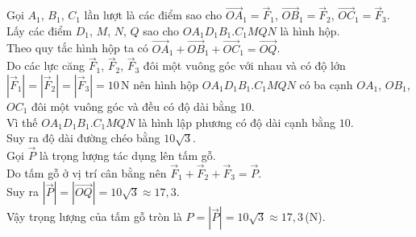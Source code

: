 \begin{ex}
{\begin{center}
\end{center}
Gọi $A_1$, $B_1$, $C_1$ lần lượt là các điểm sao cho $\overrightarrow{OA}_1=\overrightarrow{F}_1$, $\overrightarrow{OB}_1=\overrightarrow{F}_2$, $\overrightarrow{OC}_1=\overrightarrow{F}_3$.\\
Lấy các điểm $D_1$, $M$, $N$, $Q$ sao cho $OA_1D_1B_1.C_1MQN$ là hình hộp.\\
Theo quy tắc hình hộp ta có $\overrightarrow{OA}_1+\overrightarrow{OB}_1+\overrightarrow{OC}_1=\overrightarrow{OQ}$.\\
Do các lực căng $\overrightarrow{F}_1$, $\overrightarrow{F}_2$, $\overrightarrow{F}_3$ đôi một vuông góc với nhau và có độ lớn $\left| \overrightarrow{F}_1 \right|=\left| \overrightarrow{F}_2 \right|=\left| \overrightarrow{F}_3 \right|=10$\,N nên hình hộp $OA_1D_1B_1.C_1MQN$ có ba cạnh $OA_1$, $OB_1$, $OC_1$ đôi một vuông góc và đều có độ dài bằng $10$.\\
Vì thế $OA_1D_1B_1.C_1MQN$ là hình lập phương có độ dài cạnh bằng $10$.\\
Suy ra độ dài đường chéo bằng $10\sqrt{3}$.\\
Gọi $\overrightarrow{P}$ là trọng lượng tác dụng lên tấm gỗ.\\
Do tấm gỗ ở vị trí cân bằng nên $\overrightarrow{F}_1+\overrightarrow{F}_2+\overrightarrow{F}_3=\overrightarrow{P}$.\\
Suy ra $\left| \overrightarrow{P} \right|=\left| \overrightarrow{OQ} \right|=10\sqrt{3}\approx 17{,}3$.\\
Vậy trọng lượng của tấm gỗ tròn là $P=\left| \overrightarrow{P} \right|=10\sqrt{3}\approx 17{,}3$\,(N).}
\end{ex}

